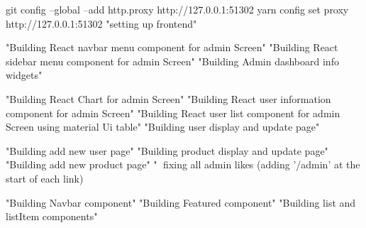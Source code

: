git config --global --add http.proxy http://127.0.0.1:51302
yarn config set proxy http://127.0.0.1:51302
"setting up frontend"

"Building React navbar menu component for admin Screen"
"Building React sidebar menu component for admin Screen"
"Building Admin dashboard info widgets"

"Building React Chart for admin Screen"
"Building React user information component for admin Screen"
"Building React user list component for admin Screen using material Ui table"
"Building user display and update page"

"Building add new user page"
"Building product display and update page"
"Building add new product page"
"🔨 fixing all admin likes (adding '/admin' at the start of each link)

"Building Navbar component"
"Building Featured component"
"Building list and listItem components"